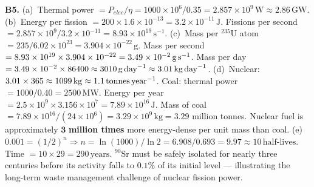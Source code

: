 \textbf{B5.}
(a)~Thermal power $=P_{elec}/\eta
=1000\times10^6/0.35=2.857\times10^9\,\text{W}
\approx2.86\,\text{GW}$. \quad
(b)~Energy per fission $=200\times1.6\times10^{-13}
=3.2\times10^{-11}\,\text{J}$.
Fissions per second $=2.857\times10^9/3.2\times10^{-11}
=8.93\times10^{19}\,\text{s}^{-1}$. \quad
(c)~Mass per ${}^{235}$U atom $=235/6.02\times10^{23}
=3.904\times10^{-22}\,\text{g}$.
Mass per second $=8.93\times10^{19}\times3.904
\times10^{-22}=3.49\times10^{-2}\,\text{g\,s}^{-1}$.
Mass per day $=3.49\times10^{-2}\times86400
\approx3010\,\text{g\,day}^{-1}\approx3.01\,\text{kg\,day}^{-1}$.
\quad
(d)~Nuclear: $3.01\times365\approx1099\,\text{kg}
\approx1.1\,\text{tonnes\,year}^{-1}$.
Coal: thermal power $=1000/0.40=2500\,\text{MW}$.
Energy per year $=2.5\times10^9\times3.156
\times10^7=7.89\times10^{16}\,\text{J}$.
Mass of coal $=7.89\times10^{16}/(24\times10^6)
=3.29\times10^9\,\text{kg}=3.29$ million tonnes.
Nuclear fuel is approximately $\mathbf{3}$ \textbf{million
times} more energy-dense per unit mass than coal. \quad
(e)~$0.001=(1/2)^n\Rightarrow n=\ln(1000)/\ln2
=6.908/0.693=9.97\approx10\,\text{half-lives}$.
Time $=10\times29=290\,\text{years}$.
${}^{90}$Sr must be safely isolated for nearly three
centuries before its activity falls to $0.1\%$ of
its initial level --- illustrating the long-term
waste management challenge of nuclear fission power.

 \endgroup


